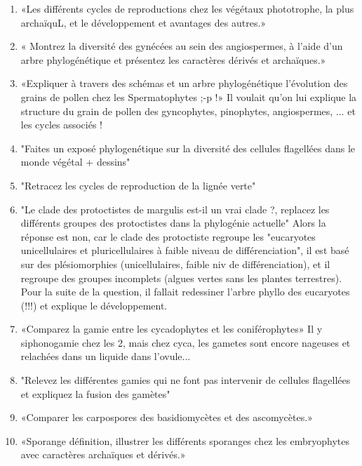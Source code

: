 \begin{enumerate}
	\item «Les différents cycles de reproductions chez les végétaux phototrophe, la plus archaïquL, et le développement et avantages des autres.»

	\item « Montrez la diversité des gynécées au sein des angiospermes, à l'aide d'un arbre phylogénétique et présentez les caractères dérivés et archaïques.»

	\item «Expliquer à travers des schémas et un arbre phylogénétique l'évolution des grains de pollen chez les Spermatophytes ;-p !»  Il voulait qu'on lui explique la structure du grain de pollen des gyncophytes, pinophytes, angiospermes, ... et les cycles associés !

	\item "Faites un exposé phylogenétique sur la diversité des cellules flagellées dans le monde végétal + dessins"

	\item "Retracez les cycles de reproduction de la lignée verte"

	\item "Le clade des protoctistes de margulis est-il un vrai clade ?, replacez les différents groupes des protoctistes dans la phylogénie actuelle"
Alors la réponse est non, car le clade des protoctiste regroupe les "eucaryotes unicellulaires et pluricellulaires à faible niveau de différenciation", il est basé sur des plésiomorphies (unicellulaires, faible niv de différenciation), et il regroupe des groupes incomplets (algues vertes sans les plantes terrestres). Pour la suite de la question, il fallait redessiner l'arbre phyllo des eucaryotes (!!!) et explique le développement.

	\item «Comparez la gamie entre les cycadophytes et les coniférophytes» 
Il y siphonogamie chez les 2, mais chez cyca, les gametes sont encore nageuses et
relachées dans un liquide dans l'ovule...

	\item "Relevez les différentes gamies qui ne font pas intervenir de cellules flagellées et expliquez la fusion des gamètes"

	\item «Comparer les carpospores des basidiomycètes et des ascomycètes.»

	\item «Sporange définition, illustrer les différents sporanges chez les embryophytes avec caractères archaïques et dérivés.»


\end{enumerate}
